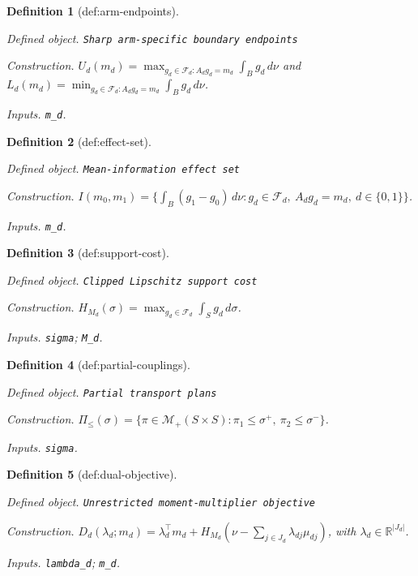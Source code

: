 \documentclass{article}
\newtheorem{definition}{Definition}
\begin{document}
\begin{definition}[def:arm-endpoints]\label{def:arm-endpoints}
\par\smallskip\noindent\emph{Defined object.} \texttt{Sharp arm-\allowbreak{}specific boundary endpoints}
\par\smallskip\noindent\emph{Construction.} \(U_d(m_d)=\max_{g_d\in\mathcal F_d:A_dg_d=m_d}\int_Bg_d\,d\nu\) and \(L_d(m_d)=\min_{g_d\in\mathcal F_d:A_dg_d=m_d}\int_Bg_d\,d\nu\).
\par\smallskip\noindent\emph{Inputs.} \texttt{m\_\allowbreak{}d}.
\end{definition}

\begin{definition}[def:effect-set]\label{def:effect-set}
\par\smallskip\noindent\emph{Defined object.} \texttt{Mean-\allowbreak{}information effect set}
\par\smallskip\noindent\emph{Construction.} \(I(m_0,m_1)=\{\int_B(g_1-g_0)\,d\nu:g_d\in\mathcal F_d,\ A_dg_d=m_d,\ d\in\{0,1\}\}\).
\par\smallskip\noindent\emph{Inputs.} \texttt{m\_\allowbreak{}d}.
\end{definition}

\begin{definition}[def:support-cost]\label{def:support-cost}
\par\smallskip\noindent\emph{Defined object.} \texttt{Clipped Lipschitz support cost}
\par\smallskip\noindent\emph{Construction.} \(H_{M_d}(\sigma)=\max_{g_d\in\mathcal F_d}\int_Sg_d\,d\sigma\).
\par\smallskip\noindent\emph{Inputs.} \texttt{sigma}; \texttt{M\_\allowbreak{}d}.
\end{definition}

\begin{definition}[def:partial-couplings]\label{def:partial-couplings}
\par\smallskip\noindent\emph{Defined object.} \texttt{Partial transport plans}
\par\smallskip\noindent\emph{Construction.} \(\Pi_{\le}(\sigma)=\{\pi\in\mathcal M_+(S\times S):\pi_1\le\sigma^+,\ \pi_2\le\sigma^-\}\).
\par\smallskip\noindent\emph{Inputs.} \texttt{sigma}.
\end{definition}

\begin{definition}[def:dual-objective]\label{def:dual-objective}
\par\smallskip\noindent\emph{Defined object.} \texttt{Unrestricted moment-\allowbreak{}multiplier objective}
\par\smallskip\noindent\emph{Construction.} \(D_d(\lambda_d;m_d)=\lambda_d^\top m_d+H_{M_d}(\nu-\sum_{j\in J_d}\lambda_{dj}\mu_{dj})\), with \(\lambda_d\in\mathbb R^{|J_d|}\).
\par\smallskip\noindent\emph{Inputs.} \texttt{lambda\_\allowbreak{}d}; \texttt{m\_\allowbreak{}d}.
\end{definition}
\end{document}

